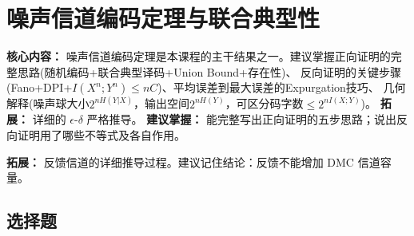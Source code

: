\documentclass[12pt,a4paper]{ctexart}
\begin{document}
\section{噪声信道编码定理与联合典型性}

\begin{notetested}
\textbf{核心内容：} 噪声信道编码定理是本课程的主干结果之一。建议掌握正向证明的完整思路(随机编码+联合典型译码+Union Bound+存在性)、
反向证明的关键步骤(Fano+DPI+$I(X^n;Y^n)\leq nC$)、平均误差到最大误差的Expurgation技巧、
几何解释(噪声球大小$2^{nH(Y|X)}$，输出空间$2^{nH(Y)}$，可区分码字数$\leq 2^{nI(X;Y)}$)。
\textbf{拓展：} 详细的 $\epsilon$-$\delta$ 严格推导。
\textbf{建议掌握：} 能完整写出正向证明的五步思路；说出反向证明用了哪些不等式及各自作用。
\end{notetested}

\begin{noteskipped}
\textbf{拓展：} 反馈信道的详细推导过程。建议记住结论：反馈不能增加 DMC 信道容量。
\end{noteskipped}

\subsection*{选择题}
\end{document}
